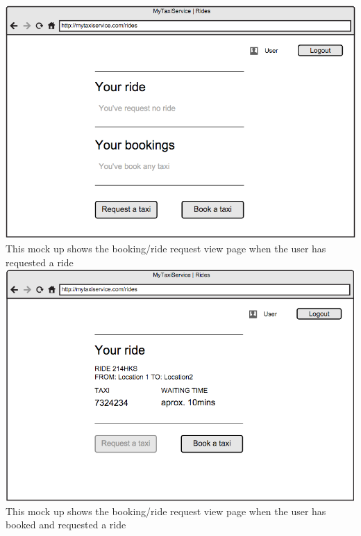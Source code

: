\documentclass[11pt,titlepage]{article} %
\begin{document}
        \includegraphics[scale=0.52]{viewEmptyInt.png}\newline
        \newpage
        \noindent
        This mock up shows the booking/ride request view page when the user has requested a ride \newline
        \newline
        \includegraphics[scale=0.52]{viewReqInt.png}\newline
        \newpage
        \noindent
        This mock up shows the booking/ride request view page when the user has booked and requested a ride\newline
        \newline
\end{document}
